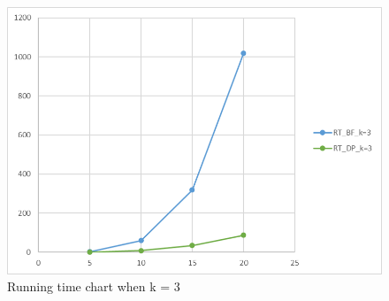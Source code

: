 \documentclass{article}
\theoremstyle{plain}
\theoremstyle{definition}
\theoremstyle{remark}
\begin{document}
\begin{figure}[htbp]
\begin{center}
\includegraphics[scale=0.7]{RT_BF_DP_k-3}
\caption{Running time chart when k = 3} \label{fig:label}
\end{center}
\end{figure}

\clearpage
\printbibliography
\end{document}
